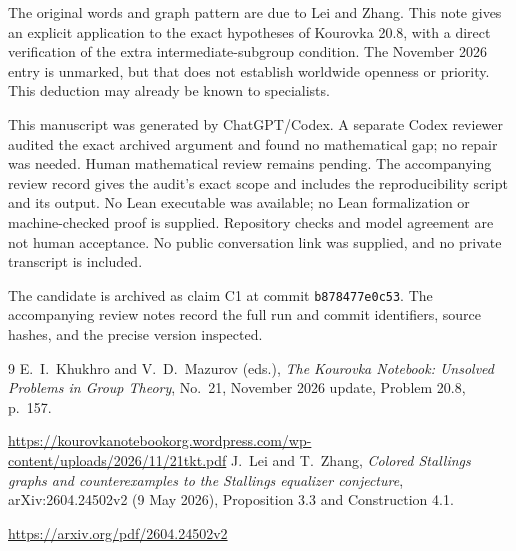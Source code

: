 \documentclass[11pt,a4paper]{article}
\begin{document}
The original words and graph pattern are due to Lei and Zhang. This note gives an explicit application to the exact hypotheses of Kourovka 20.8, with a direct verification of the extra intermediate-subgroup condition. The November 2026 entry is unmarked, but that does not establish worldwide openness or priority. This deduction may already be known to specialists.

This manuscript was generated by ChatGPT/Codex. A separate Codex reviewer audited the exact archived argument and found no mathematical gap; no repair was needed. Human mathematical review remains pending. The accompanying review record gives the audit's exact scope and includes the reproducibility script and its output. No Lean executable was available; no Lean formalization or machine-checked proof is supplied. Repository checks and model agreement are not human acceptance. No public conversation link was supplied, and no private transcript is included.

The candidate is archived as claim C1 at commit \texttt{b878477e0c53}. The accompanying review notes record the full run and commit identifiers, source hashes, and the precise version inspected.

\begin{thebibliography}{9}
 E.~I.~Khukhro and V.~D.~Mazurov (eds.), \emph{The Kourovka Notebook: Unsolved Problems in Group Theory}, No.~21, November 2026 update, Problem 20.8, p.~157.\par\url{https://kourovkanotebookorg.wordpress.com/wp-content/uploads/2026/11/21tkt.pdf}
 J.~Lei and T.~Zhang, \emph{Colored Stallings graphs and counterexamples to the Stallings equalizer conjecture}, arXiv:2604.24502v2 (9 May 2026), Proposition 3.3 and Construction 4.1.\par\url{https://arxiv.org/pdf/2604.24502v2}
\end{thebibliography}
\end{document}
